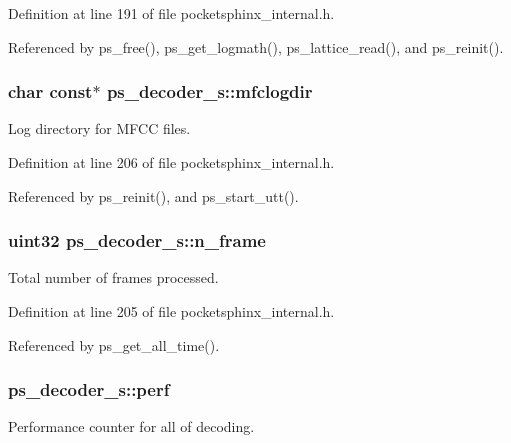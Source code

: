 Definition at line 191 of file pocketsphinx\-\_\-internal.\-h.



Referenced by ps\-\_\-free(), ps\-\_\-get\-\_\-logmath(), ps\-\_\-lattice\-\_\-read(), and ps\-\_\-reinit().

\subsubsection[{mfclogdir}]{\setlength{\rightskip}{0pt plus 5cm}char const$\ast$ ps\-\_\-decoder\-\_\-s\-::mfclogdir}\label{structps__decoder__s_a8bb5ef8791798b8dd9bc82b1ec016663}


Log directory for M\-F\-C\-C files. 



Definition at line 206 of file pocketsphinx\-\_\-internal.\-h.



Referenced by ps\-\_\-reinit(), and ps\-\_\-start\-\_\-utt().

\subsubsection[{n\-\_\-frame}]{\setlength{\rightskip}{0pt plus 5cm}uint32 ps\-\_\-decoder\-\_\-s\-::n\-\_\-frame}\label{structps__decoder__s_a2886b321c576c7def449ebb2f37899fd}


Total number of frames processed. 



Definition at line 205 of file pocketsphinx\-\_\-internal.\-h.



Referenced by ps\-\_\-get\-\_\-all\-\_\-time().

\subsubsection[{perf}]{ ps\-\_\-decoder\-\_\-s\-::perf}\label{structps__decoder__s_ab42d1d1e300d2a6df5dd3cd796a27d43}


Performance counter for all of decoding. 



